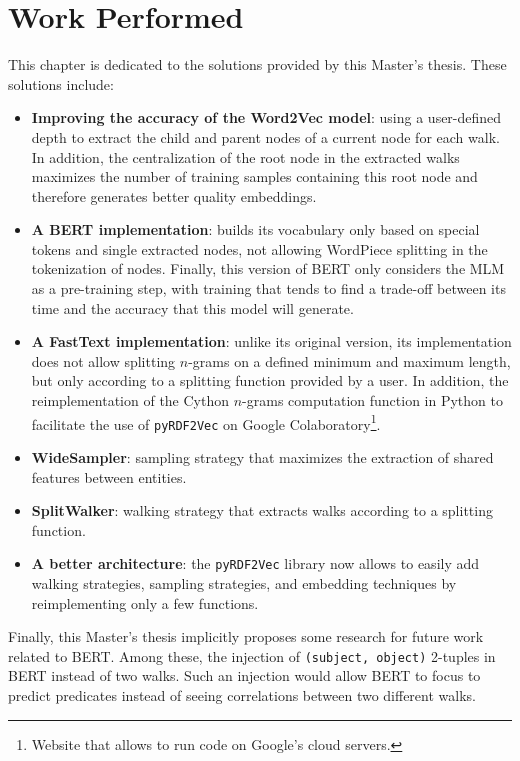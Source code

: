 
\chapter{Work Performed}
\label{chap:work:performed}

This chapter is dedicated to the solutions provided by this Master's
thesis. These solutions include:
\begin{itemize}
\item \textbf{Improving the accuracy of the Word2Vec model}: using a user-defined
depth to extract the child and parent nodes of a current node for each walk. In
addition, the centralization of the root node in the extracted walks
maximizes the number of training samples containing this root node and therefore
generates better quality embeddings.
\item \textbf{A BERT implementation}: builds its vocabulary only based on
special tokens and single extracted nodes, not allowing WordPiece splitting in
the tokenization of nodes. Finally, this version of BERT only considers
the MLM as a pre-training step, with training that tends to find a trade-off
between its time and the accuracy that this model will generate.
\item \textbf{A FastText implementation}: unlike its original version, its
implementation does not allow splitting $n$-grams on a defined minimum and maximum
length, but only according to a splitting function provided by a user. In
addition, the reimplementation of the Cython $n$-grams computation function in
Python to facilitate the use of \texttt{pyRDF2Vec} on Google
Colaboratory\footnote{Website that allows to run code on Google's cloud
servers.}.
\item \textbf{WideSampler}: sampling strategy that maximizes the extraction of
  shared features between entities.
\item \textbf{SplitWalker}: walking strategy that extracts walks according to a
  splitting function.
\item \textbf{A better architecture}: the \texttt{pyRDF2Vec} library now allows
to easily add walking strategies, sampling strategies, and embedding techniques
by reimplementing only a few functions.
\end{itemize}

Finally, this Master's thesis implicitly proposes some research for future work
related to BERT. Among these, the injection of \texttt{(subject, object)}
2-tuples in BERT instead of two walks. Such an injection would allow BERT to
focus to predict predicates instead of seeing correlations between two different
walks.

